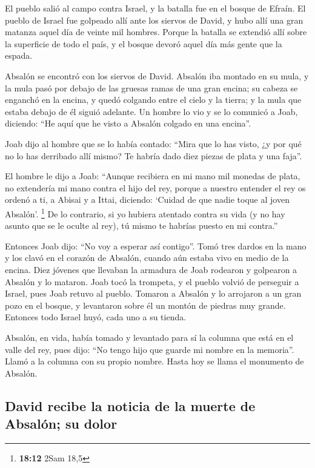  El pueblo salió al campo contra Israel, y la batalla fue
en el bosque de Efraín.  El pueblo de Israel fue golpeado
allí ante los siervos de David, y hubo allí una gran matanza aquel día
de veinte mil hombres.  Porque la batalla se extendió allí
sobre la superficie de todo el país, y el bosque devoró aquel día más
gente que la espada.

 Absalón se encontró con los siervos de David. Absalón iba
montado en su mula, y la mula pasó por debajo de las gruesas ramas de
una gran encina; su cabeza se enganchó en la encina, y quedó colgando
entre el cielo y la tierra; y la mula que estaba debajo de él siguió
adelante.  Un hombre lo vio y se lo comunicó a Joab,
diciendo: ``He aquí que he visto a Absalón colgado en una encina''.

 Joab dijo al hombre que se lo había contado: ``Mira que
lo has visto, ¿y por qué no lo has derribado allí mismo? Te habría dado
diez piezas de plata y una faja''.

 El hombre le dijo a Joab: ``Aunque recibiera en mi mano
mil monedas de plata, no extendería mi mano contra el hijo del rey,
porque a nuestro entender el rey os ordenó a ti, a Abisai y a Ittai,
diciendo: `Cuidad de que nadie toque al joven Absalón'. \footnote{\textbf{18:12}
  2Sam 18,5}  De lo contrario, si yo hubiera atentado
contra su vida (y no hay asunto que se le oculte al rey), tú mismo te
habrías puesto en mi contra.''

 Entonces Joab dijo: ``No voy a esperar así contigo''.
Tomó tres dardos en la mano y los clavó en el corazón de Absalón, cuando
aún estaba vivo en medio de la encina.  Diez jóvenes que
llevaban la armadura de Joab rodearon y golpearon a Absalón y lo
mataron.  Joab tocó la trompeta, y el pueblo volvió de
perseguir a Israel, pues Joab retuvo al pueblo.  Tomaron
a Absalón y lo arrojaron a un gran pozo en el bosque, y levantaron sobre
él un montón de piedras muy grande. Entonces todo Israel huyó, cada uno
a su tienda.

 Absalón, en vida, había tomado y levantado para sí la
columna que está en el valle del rey, pues dijo: ``No tengo hijo que
guarde mi nombre en la memoria''. Llamó a la columna con su propio
nombre. Hasta hoy se llama el monumento de Absalón.

\hypertarget{david-recibe-la-noticia-de-la-muerte-de-absaluxf3n-su-dolor}{%
\subsection{David recibe la noticia de la muerte de Absalón; su
dolor}\label{david-recibe-la-noticia-de-la-muerte-de-absaluxf3n-su-dolor}}

